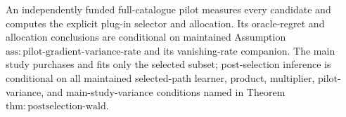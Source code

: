 An independently funded full-catalogue pilot measures every candidate and computes the explicit plug-in selector and allocation.  Its oracle-regret and allocation conclusions are conditional on maintained Assumption~\(\mathrm{ass{:}pilot\text{-}gradient\text{-}variance\text{-}rate}\) and its vanishing-rate companion.  The main study purchases and fits only the selected subset; post-selection inference is conditional on all maintained selected-path learner, product, multiplier, pilot-variance, and main-study-variance conditions named in Theorem~\(\mathrm{thm{:}postselection\text{-}wald}\).